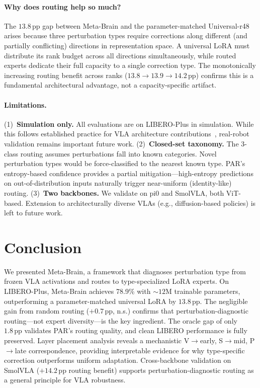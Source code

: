\documentclass[10pt,twocolumn]{article}
\newcommand{\ours}{Meta-Brain}
\newcommand{\liplus}{LIBERO-Plus}
\newcommand{\pp}{\,\text{pp}}
\begin{document}
\paragraph{Why does routing help so much?}
The $13.8\pp$ gap between \ours{} and the parameter-matched Universal-r48 arises because three perturbation types require corrections along different (and partially conflicting) directions in representation space.
A universal LoRA must distribute its rank budget across all directions simultaneously, while routed experts dedicate their full capacity to a single correction type.
The monotonically increasing routing benefit across ranks ($13.8 \to 13.9 \to 14.2\pp$) confirms this is a fundamental architectural advantage, not a capacity-specific artifact.

\paragraph{Limitations.}
(1)~\textbf{Simulation only.}
All evaluations are on \liplus{} in simulation.
While this follows established practice for VLA architecture contributions~\cite{vlagserouting2026,safe2026,luo2025robustvla}, real-robot validation remains important future work.
(2)~\textbf{Closed-set taxonomy.}
The 3-class routing assumes perturbations fall into known categories.
Novel perturbation types would be force-classified to the nearest known type.
PAR's entropy-based confidence provides a partial mitigation---high-entropy predictions on out-of-distribution inputs naturally trigger near-uniform (identity-like) routing.
(3)~\textbf{Two backbones.}
We validate on pi0 and SmolVLA, both ViT-based.
Extension to architecturally diverse VLAs (e.g., diffusion-based policies) is left to future work.


\section{Conclusion}
\label{sec:conclusion}

We presented \ours{}, a framework that diagnoses perturbation type from frozen VLA activations and routes to type-specialized LoRA experts.
On \liplus{}, \ours{} achieves 78.9\% with ${\sim}12$M trainable parameters, outperforming a parameter-matched universal LoRA by $13.8\pp$.
The negligible gain from random routing ($+0.7\pp$, n.s.) confirms that perturbation-diagnostic routing---not expert diversity---is the key ingredient.
The oracle gap of only $1.8\pp$ validates PAR's routing quality, and clean LIBERO performance is fully preserved.
Layer placement analysis reveals a mechanistic V$\to$early, S$\to$mid, P$\to$late correspondence, providing interpretable evidence for why type-specific correction outperforms uniform adaptation.
Cross-backbone validation on SmolVLA ($+14.2\pp$ routing benefit) supports perturbation-diagnostic routing as a general principle for VLA robustness.
\end{document}
